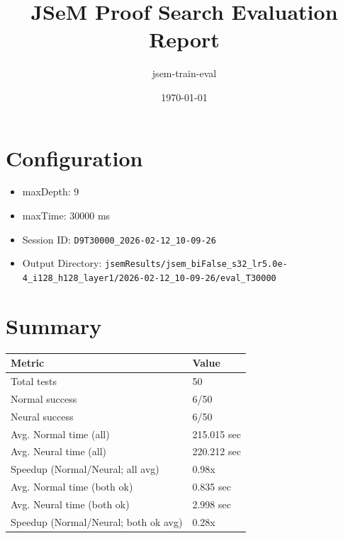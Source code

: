 \documentclass[a4paper,10pt]{article}
\title{JSeM Proof Search Evaluation Report}
\author{jsem-train-eval}
\date{\today}
\begin{document}
\maketitle

\section{Configuration}
\begin{itemize}
\item maxDepth: 9
\item maxTime: 30000 ms
\item Session ID: \texttt{D9T30000\_2026-02-12\_10-09-26}
\item Output Directory: \texttt{jsemResults/jsem\_biFalse\_s32\_lr5.0e-4\_i128\_h128\_layer1/2026-02-12\_10-09-26/eval\_T30000}
\end{itemize}

\section{Summary}
\begin{tabular}{ll}
\toprule
\textbf{Metric} & \textbf{Value} \\
\midrule
Total tests & 50 \\
Normal success & 6/50 \\
Neural success & 6/50 \\
\midrule
Avg. Normal time (all) & 215.015 sec \\
Avg. Neural time (all) & 220.212 sec \\
Speedup (Normal/Neural; all avg) & 0.98x \\
Avg. Normal time (both ok) & 0.835 sec \\
Avg. Neural time (both ok) & 2.998 sec \\
Speedup (Normal/Neural; both ok avg) & 0.28x \\
\bottomrule
\end{tabular}
\end{document}
